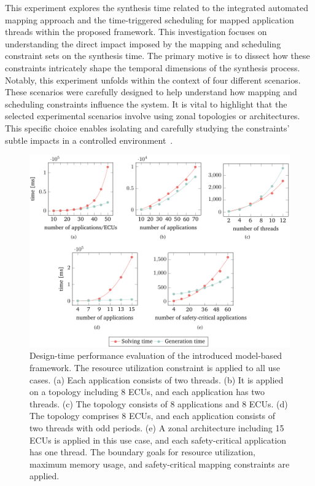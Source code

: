     This experiment explores the synthesis time related to the integrated automated mapping approach and the time-triggered scheduling for mapped application threads within the proposed framework. This investigation focuses on understanding the direct impact imposed by the mapping and scheduling constraint sets on the synthesis time. The primary motive is to dissect how these constraints intricately shape the temporal dimensions of the synthesis process. Notably, this experiment unfolds within the context of four different scenarios. These scenarios were carefully designed to help understand how mapping and scheduling constraints influence the system.
    It is vital to highlight that the selected experimental scenarios involve using zonal topologies or architectures. This specific choice enables isolating and carefully studying the constraints' subtle impacts in a controlled environment~\cite{askaripoor2023designer}.



       \begin{figure}[ht]
    	\centering
    	\includegraphics[width=1\textwidth]{figures/results_mapping_scheduling.pdf}
   	\caption{Design-time performance evaluation of the introduced model-based framework. The resource utilization constraint is applied to all use cases. (a) Each application consists of two threads. (b) It is applied on a topology including 8 ECUs, and each application has two threads. (c) The topology consists of 8 applications and 8 ECUs. (d) The topology comprises 8 ECUs, and each application consists of two threads with odd periods.
   	    (e) A zonal architecture including 15 ECUs is applied in this use case, and each safety-critical application has one thread. The boundary goals for resource utilization, maximum memory usage, and safety-critical mapping constraints are applied.}
    	\label{fig72}
        \end{figure} 


